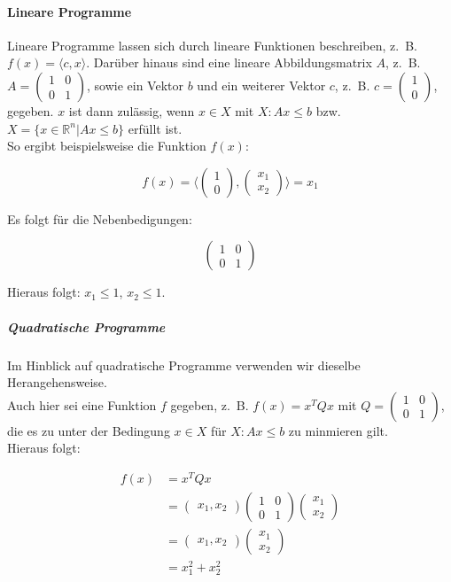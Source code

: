 \paragraph{Lineare Programme}

Lineare Programme lassen sich durch lineare Funktionen beschreiben, z.~B. $f(x) = \langle c, x \rangle$. Darüber hinaus sind eine lineare Abbildungsmatrix $A$, z.~B. $A = \begin{pmatrix}1 & 0 \\ 0 & 1 \end{pmatrix}$, sowie ein Vektor $b$ und ein weiterer Vektor $c$, z.~B. $c = \begin{pmatrix}1 \\ 0 \end{pmatrix}$, gegeben. $x$ ist dann zulässig, wenn $x \in X$ mit $X: Ax \le b$ bzw. $X = \{x \in \mathbb{R}^{n} | Ax \le b\}$ erfüllt ist. \\
So ergibt beispielsweise die Funktion $f(x)$:

\begin{equation*}
f(x) = \langle \begin{pmatrix}1 \\ 0 \end{pmatrix}, \begin{pmatrix}x_{1} \\ x_{2} \end{pmatrix} \rangle = x_{1}
\end{equation*}

Es folgt für die Nebenbedigungen:

\begin{equation*}
\begin{pmatrix}1 & 0 \\ 0 & 1 \end{pmatrix}
\end{equation*}

Hieraus folgt: $x_{1} \le 1$, $x_{2} \le 1$.

\subparagraph{Quadratische Programme}

Im Hinblick auf quadratische Programme verwenden wir dieselbe Herangehensweise. \\
Auch hier sei eine Funktion $f$ gegeben, z.~B. $f(x) = x^{T}Qx$ mit $Q = \begin{pmatrix}1 & 0 \\ 0 & 1 \end{pmatrix}$, die es zu unter der Bedingung $x \in X$ für $X: Ax \le b$ zu minmieren gilt.\\
Hieraus folgt:

\begin{align*}
f(x) &= x^{T}Qx \\
&= \begin{pmatrix}x_{1}, x_{2}\end{pmatrix} \begin{pmatrix}1 & 0 \\ 0 & 1\end{pmatrix} \begin{pmatrix}x_{1} \\ x_{2}\end{pmatrix} \\
&= \begin{pmatrix}x_{1}, x_{2}\end{pmatrix} \begin{pmatrix}x_{1} \\ x_{2}\end{pmatrix} \\
&= x_{1}^{2} + x_{2}^{2}
\end{align*}
